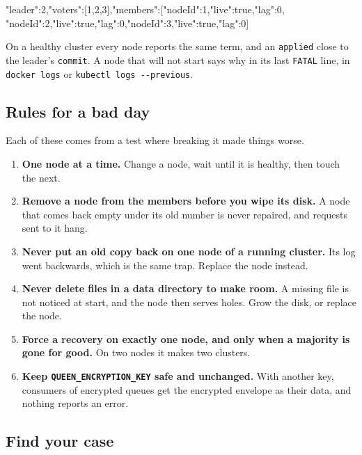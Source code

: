 \begin{shell}
{"leader":2,"voters":[1,2,3],"members":[{"nodeId":1,"live":true,"lag":0},
{"nodeId":2,"live":true,"lag":0},{"nodeId":3,"live":true,"lag":0}]}
\end{shell}

On a healthy cluster every node reports the same term, and an \texttt{applied} close to the
leader's \texttt{commit}. A node that will not start says why in its last \texttt{FATAL} line, in
\texttt{docker logs} or \texttt{kubectl logs -{}-previous}.

\subsection{Rules for a bad day}

Each of these comes from a test where breaking it made things worse.

\begin{enumerate}
\item \textbf{One node at a time.} Change a node, wait until it is healthy, then touch the next.
\item \textbf{Remove a node from the members before you wipe its disk.} A node that comes back
empty under its old number is never repaired, and requests sent to it hang.
\item \textbf{Never put an old copy back on one node of a running cluster.} Its log went backwards,
which is the same trap. Replace the node instead.
\item \textbf{Never delete files in a data directory to make room.} A missing file is not noticed at
start, and the node then serves holes. Grow the disk, or replace the node.
\item \textbf{Force a recovery on exactly one node, and only when a majority is gone for good.} On
two nodes it makes two clusters.
\item \textbf{Keep \texttt{QUEEN\_ENCRYPTION\_KEY} safe and unchanged.} With another key, consumers
of encrypted queues get the encrypted envelope as their data, and nothing reports an error.
\end{enumerate}

\subsection{Find your case}

